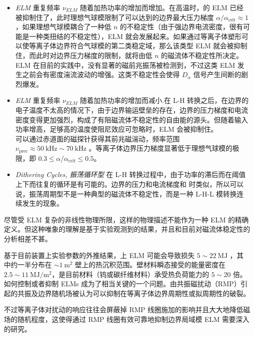 \begin{itemize}
    \item \textit{\typeone ELM}  重复频率 $\nu_{ELM}$ 随着加热功率的增加而增加。在高温时，\typethr 的 ELM 已经被抑制住了，此时理想气球模限制了可以达到的边界最大压力梯度 $\alpha/\alpha_{\text{crit}}\approx 1$，如果理想气球模耦合了一种低 $n$ 的不稳定性（由于强边界电流密度，很有可能是一种类扭结的不稳定性），\typethr ELM 就会发展起来。如果通过等离子体塑形可以使等离子体边界符合气球模的第二类稳定域，那么该类型 ELM 就会被抑制住，而此时对边界压力梯度的限制，就将由低 $n$ 的磁流体不稳定性所决定。\\
    ELM 在目前的实践中，没有显著的磁前兆振荡被检测到，不过这类 ELM 发生之前会有密度湍流波动的增强。这类不稳定性会使得 $D_\alpha$ 信号产生间断的剧烈爆发。
    \item \textit{\typethr ELM} 重复频率 $\nu_{ELM}$ 随着加热功率的增加而减小.在 L-H 转换之后，在边界的电子温度不太高的情况下，由于边界输运壁垒的存在，边界的压力梯度和电流密度变得更加强烈，构成了有阻磁流体不稳定性的自由能的源头。但随着输入功率增高，足够高的温度使阻尼效应可忽略时，\typethr ELM 会被抑制住。\\
    可以通过赤道面的磁探针获得其前兆磁湍动，频率范围 $\nu_{\text{prec}}\approx \SI{50}{\kilo\hertz} \sim \SI{70}{\kilo\hertz}$ 。等离子体边界压力梯度显著低于理想气球模的极限，即 $0.3\leq \alpha/\alpha_{\text{crit}}\leq 0.5$。
    \item \textit{Dithering Cycles, 振荡循环型} 在 L-H 转换过程中，由于\Hmode 功率的滞后而在阈值上下而往复的循环是有可能的。边界的压力和电流梯度和 \Lmode 时类似，所以可以说，振荡周期型不是一种典型的磁流体不稳定性，而是一种 L-H-L 模转换连续发生的现象。
\end{itemize}

尽管受 ELM 复杂的非线性物理所限，这样的物理描述不能作为一种 ELM 的精确定义。但这种唯象的理解是基于实验观测到的结果，并且和目前对磁流体稳定性的分析相差不甚。



\cite{2003PPCF...45.1549L} 基于目前装置上实验参数的外推结果，\iter 上 \typeone ELM 可能会导致损失 $5\sim \SI{22}{\mega\joule}$ ，其中约一半分布在 $\sim \SI{1}{\meter^2}$ 壁上的热沉积范围。壁材料瞬态接受的能量密度在 $2.5\sim \SI{11}{\mega\joule/\meter^2}$，是目前材料（钨或碳纤维材料）承受热负荷能力的 $5\sim 20$ 倍。如何控制或者抑制 ELMs 成为了相当关键的一个问题。由共振磁扰动（RMP）引起的共振及边界随机场被认为可以抑制在等离子体边界周期性或拟周期性的破裂。


不过等离子体对扰动的响应往往会屏蔽掉 RMP 线圈施加的影响并且大大地降低磁场的随机程度，这使得通过 RMP 线圈有效可靠地抑制边界局域模 ELM 需要深入的研究。

